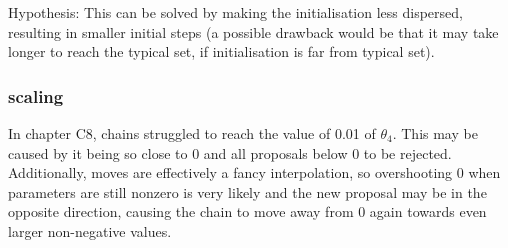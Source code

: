 Hypothesis: This can be solved by making the initialisation less dispersed, resulting in smaller initial steps (a possible drawback would be that it may take longer to reach the typical set, if initialisation is far from typical set).

\subsubsection{scaling}
In chapter C8, chains struggled to reach the value of 0.01 of $\theta_4$. This may be caused by it being so close to 0 and all proposals below 0 to be rejected. Additionally, moves are effectively a fancy interpolation, so overshooting 0 when parameters are still nonzero is very likely and the new proposal may be in the opposite direction, causing the chain to move away from 0 again towards even larger non-negative values. 